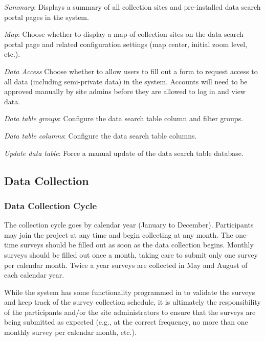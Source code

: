 \begin{DoxyItemize}
\item {\itshape Summary}\+: Displays a summary of all collection sites and pre-\/installed data search portal pages in the system.
\item {\itshape Map}\+: Choose whether to display a map of collection sites on the data search portal page and related configuration settings (map center, initial zoom level, etc.).
\item {\itshape Data Access} Choose whether to allow users to fill out a form to request access to all data (including semi-\/private data) in the system. Accounts will need to be approved manually by site admins before they are allowed to log in and view data.
\item {\itshape Data table groups}\+: Configure the data search table column and filter groups.
\item {\itshape Data table columns}\+: Configure the data search table columns.
\item {\itshape Update data table}\+: Force a manual update of the data search table database.
\end{DoxyItemize}

\subsection*{Data Collection}

\subsubsection*{Data Collection Cycle}

The collection cycle goes by calendar year (January to December). Participants may join the project at any time and begin collecting at any month. The one-\/time surveys should be filled out as soon as the data collection begins. Monthly surveys should be filled out once a month, taking care to submit only one survey per calendar month. Twice a year surveys are collected in May and August of each calendar year.

While the system has some functionality programmed in to validate the surveys and keep track of the survey collection schedule, it is ultimately the responsibility of the participants and/or the site administrators to ensure that the surveys are being submitted as expected (e.\+g., at the correct frequency, no more than one monthly survey per calendar month, etc.).

